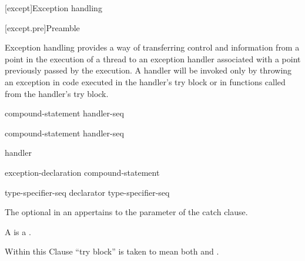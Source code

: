 [except]{Exception handling}%


%

[except.pre]{Preamble}

\pnum
Exception handling provides a way of transferring control and information
from a point in the execution of a thread to an exception handler
associated with a point previously passed by the execution.
A handler will be invoked only by throwing an exception
in code executed in the handler's try block
or in functions called from the handler's try block.

\begin{bnf}
\br
     compound-statement handler-seq
\end{bnf}

\begin{bnf}
\br
      compound-statement handler-seq
\end{bnf}

\begin{bnf}
\br
    handler 
\end{bnf}

\begin{bnf}
\br
     \terminal{(} exception-declaration \terminal{)} compound-statement
\end{bnf}

\begin{bnf}
\br
     type-specifier-seq declarator\br
     type-specifier-seq \br
\end{bnf}

The optional  in an 
appertains to the parameter of the catch clause.

\pnum
{}%
%
%
%
A  is a .
\begin{note}
Within this Clause
``try block'' is taken to mean both  and
.
\end{note}

